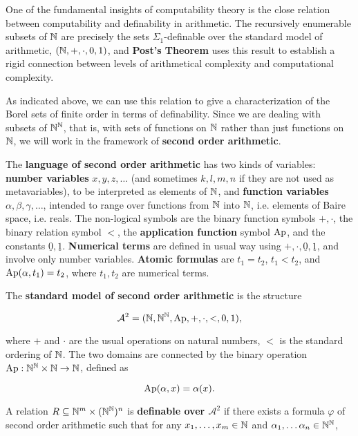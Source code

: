 One of the fundamental insights of computability theory is the close relation between computability and definability in arithmetic. The recursively enumerable subsets of $\mathbb{N}$ are precisely the sets $\Sigma_1$-definable over the standard model of arithmetic, $(\mathbb{N},+,\cdot,0,1)$, and \textbf{Post's Theorem} uses this result to establish a rigid connection between levels of arithmetical complexity and computational complexity.

As indicated above, we can use this relation to give a characterization of the Borel sets of finite order in terms of definability. Since we are dealing with subsets of $\mathbb{N}^{\mathbb{N}}$, that is, with sets of functions on $\mathbb{N}$ rather than just functions on $\mathbb{N}$, we will work in the framework of \textbf{second order arithmetic}.

The
\textbf{language of second order arithmetic} has two kinds of variables: \textbf{number variables} $x,y,z, \dots$ (and sometimes $k,l,m,n$ if they are not used as metavariables), to be interpreted as elements of $\mathbb{N}$, and \textbf{function variables} $\alpha,\beta,\gamma,\dots$, intended to range over functions from $\mathbb{N}$ into $\mathbb{N}$, i.e. elements of Baire space, i.e. reals. The non-logical symbols are the binary function symbols $+,\cdot$, the binary relation symbol $<$, the \textbf{application function} symbol $\operatorname{Ap}$, and the constants $\underline{0}, \underline{1}$.  \textbf{Numerical terms} are defined in usual way using $+,\cdot,\underline{0},\underline{1}$, and involve only number variables. \textbf{Atomic formulas} are $t_1 = t_2$, $t_1 < t_2$, and $\operatorname{Ap}(\alpha,t_1) = t_2$, where $t_1, t_2$ are numerical terms.

The
\textbf{standard model of second order arithmetic} is the structure

\begin{equation}
\mathcal{A}^2 = (\mathbb{N}, \mathbb{N}^{\mathbb{N}}, \operatorname{Ap}, +, \cdot, <, 0, 1),
\end{equation}

where $+$ and $\cdot$ are the usual operations on natural numbers, $<$ is the standard ordering of $\mathbb{N}$. The two domains are connected by the binary operation $\operatorname{Ap}: \mathbb{N}^{\mathbb{N}} \times \mathbb{N} \to \mathbb{N}$, defined as

\begin{equation}
\operatorname{Ap}(\alpha,x) = \alpha(x).
\end{equation}

A relation $R \subseteq \mathbb{N}^m \times (\mathbb{N}^{\mathbb{N}})^n$ is \textbf{definable over $\mathcal{A}^2$} if there exists a formula $\varphi$ of second order arithmetic such that for any $x_1, \dots, x_m \in \mathbb{N}$ and $\alpha_1, \dots \alpha_n \in \mathbb{N}^{\mathbb{N}}$,

